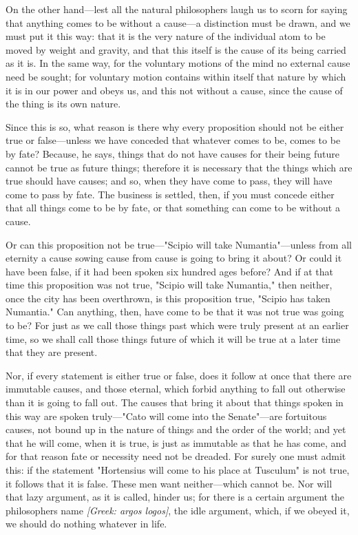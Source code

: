  On the other hand—lest all the natural philosophers laugh us to scorn for saying that anything comes to be without a cause—a distinction must be drawn, and we must put it this way: that it is the very nature of the individual atom to be moved by weight and gravity, and that this itself is the cause of its being carried as it is. In the same way, for the voluntary motions of the mind no external cause need be sought; for voluntary motion contains within itself that nature by which it is in our power and obeys us, and this not without a cause, since the cause of the thing is its own nature.

 Since this is so, what reason is there why every proposition should not be either true or false—unless we have conceded that whatever comes to be, comes to be by fate? Because, he says, things that do not have causes for their being future cannot be true as future things; therefore it is necessary that the things which are true should have causes; and so, when they have come to pass, they will have come to pass by fate. The business is settled, then, if you must concede either that all things come to be by fate, or that something can come to be without a cause.

 Or can this proposition not be true—"Scipio will take Numantia"—unless from all eternity a cause sowing cause from cause is going to bring it about? Or could it have been false, if it had been spoken six hundred ages before? And if at that time this proposition was not true, "Scipio will take Numantia," then neither, once the city has been overthrown, is this proposition true, "Scipio has taken Numantia." Can anything, then, have come to be that it was not true was going to be? For just as we call those things past which were truly present at an earlier time, so we shall call those things future of which it will be true at a later time that they are present.

 Nor, if every statement is either true or false, does it follow at once that there are immutable causes, and those eternal, which forbid anything to fall out otherwise than it is going to fall out. The causes that bring it about that things spoken in this way are spoken truly—"Cato will come into the Senate"—are fortuitous causes, not bound up in the nature of things and the order of the world; and yet that he will come, when it is true, is just as immutable as that he has come, and for that reason fate or necessity need not be dreaded. For surely one must admit this: if the statement "Hortensius will come to his place at Tusculum" is not true, it follows that it is false. These men want neither—which cannot be. Nor will that lazy argument, as it is called, hinder us; for there is a certain argument the philosophers name \textit{[Greek: argos logos]}, the idle argument, which, if we obeyed it, we should do nothing whatever in life.

